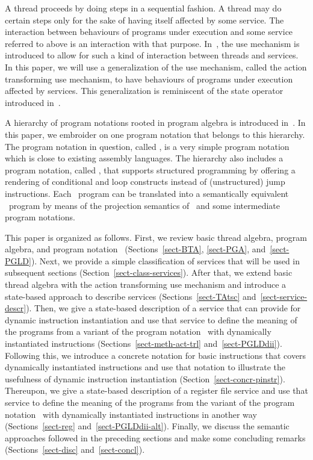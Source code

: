 \documentclass[fleqn]{llncs}
\begin{document}
A thread proceeds by doing steps in a sequential fashion.
A thread may do certain steps only for the sake of having itself
affected by some service.
The interaction between behaviours of programs under execution and some
service referred to above is an interaction with that purpose.
In~\cite{BM04c}, the use mechanism is introduced to allow for such a
kind of interaction between threads and services.
In this paper, we will use a generalization of the use mechanism, called
the action transforming use mechanism, to have behaviours of programs
under execution affected by services.
This generalization is reminiscent of the state operator introduced
in~\cite{BB88}.

A hierarchy of program notations rooted in program algebra is introduced
in~\cite{BL02a}.
In this paper, we embroider on one program notation that belongs to this
hierarchy.
The program notation in question, called \PGLD, is a very simple program
notation which is close to existing assembly languages.
The hierarchy also includes a program notation, called \PGLS, that
supports structured programming by offering a rendering of conditional
and loop constructs instead of (unstructured) jump instructions.
Each \PGLS\ program can be translated into a semantically equivalent
\PGLD\ program by means of the projection semantics of \PGLS\ and some
intermediate program notations.

This paper is organized as follows.
First, we review basic thread algebra, program algebra, and program
notation \PGLD\ (Sections~\ref{sect-BTA}, \ref{sect-PGA},
and~\ref{sect-PGLD}).
Next, we provide a simple classification of services that will be used
in subsequent sections (Section~\ref{sect-class-services}).
After that, we extend basic thread algebra with the action transforming
use mechanism and introduce a state-based approach to describe services
(Sections~\ref{sect-TAtsc} and~\ref{sect-service-descr}).
Then, we give a state-based description of a service that can provide
for dynamic instruction instantiation and use that service to define the
meaning of the programs from a variant of the program notation \PGLD\
with dynamically instantiated instructions
(Sections~\ref{sect-meth-act-trl} and~\ref{sect-PGLDdii}).
Following this, we introduce a concrete notation for basic instructions
that covers dynamically instantiated instructions and use that notation
to illustrate the usefulness of dynamic instruction instantiation
(Section~\ref{sect-concr-pinstr}).
Thereupon, we give a state-based description of a register file service
and use that service to define the meaning of the programs from the
variant of the program notation \PGLD\ with dynamically instantiated
instructions in another way (Sections~\ref{sect-reg}
and~\ref{sect-PGLDdii-alt}).
Finally, we discuss the semantic approaches followed in the preceding
sections and make some concluding remarks (Sections~\ref{sect-disc}
and~\ref{sect-concl}).
\end{document}
